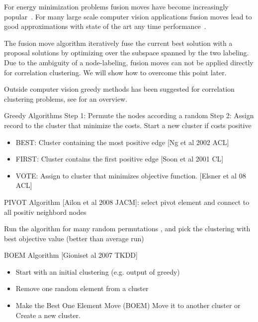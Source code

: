 \documentclass[10pt,twocolumn,letterpaper]{article}
\begin{document}
For energy minimization problems fusion moves have become increasingly popular~\cite{Lepinsky-2010,kappes_2014_ws}.
For many large scale computer vision applications fusion moves lead to good approximations
with state of the art any time performance~\cite{kappes_2014_ws}.

The fusion move algorithm iteratively fuse the current best solution with a proposal solutions
by optimizing over the subspace spanned by the two labeling. 
Due to the ambiguity of a node-labeling, fusion moves can not be applied directly for correlation clustering.
We will show how to overcome this point later.

Outside computer vision greedy methods has been suggested for correlation clustering problems, see \cite{Elsner-2009} for an overview.

Greedy Algorithms
Step 1: Permute the nodes according a random
Step 2: Assign record to the cluster that minimize the costs. Start a new cluster if costs positive
\begin{itemize}
\item BEST: Cluster containing the most positive edge [Ng et al 2002 ACL]
\item FIRST: Cluster contains the first positive edge [Soon et al 2001 CL]
\item VOTE: Assign to cluster that minimizes objective function. [Elsner et al 08 ACL]
\end{itemize}

PIVOT Algorithm [Ailon et al 2008 JACM]: select pivot element and connect to all positiv neighbord nodes

Run the algorithm for many random permutations , and pick the clustering with
best objective value (better than average run)

BOEM Algorithm [Gioniset al 2007 TKDD]
\begin{itemize}
\item Start with an initial clustering (e.g. output of greedy)
\item Remove one random element from a cluster
\item Make the Best One Element Move (BOEM)
Move it to another cluster or Create a new cluster. 
\end{itemize}

\end{document}
